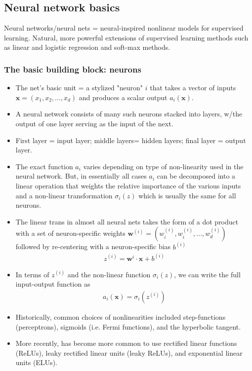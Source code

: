 \documentclass[norsk,a4paper,11pt]{article}
\begin{document}
\subsection{Neural network basics}
Neural networks/neural nets = neural-inspired nonlinear models for supervised learning. Natural, more powerful extensions of supervised learning methods such as linear and logistic regression and soft-max methods.

\subsubsection{The basic building block: neurons}
\begin{itemize}
	\item The net's basic unit = a stylized "neuron" $i$ that takes a vector of inputs $\bm{x} = (x_1, x_2, ..., x_d)$ and produces a scalar output $a_i(\bm{x})$.
	\item A neural network consists of many such neurons stacked into layers, w/the output of one layer serving as the input of the next.
	\item First layer = input layer; middle layers= hidden layers; final layer = output layer.
	\item The exact function $a_i$ varies depending on type of non-linearity used in the neural network. But, in essentially all cases $a_i$ can be decomposed into a linear operation that weights the relative importance of the various inputs and a non-linear transformation $\sigma_i(z)$ which is usually the same for all neurons.
	\item The linear trans in almost all neural nets takes the form of a dot product with a set of neuron-specific weights $\bm{w}^{(i)} = (w_i^{(i)}, w_i^{(i)}, ..., w_d^{(i)})$ followed by re-centering with a neuron-specific bias $b^{(i)}$
	\begin{align}
		z^{(i)} = \bm{w}^{i} \cdot \bm{x} + b^{(i)}
	\end{align}
	\item In terms of $z^{(i)}$ and the non-linear function $\sigma_i(z)$, we can write the full input-output function as
	\begin{align}
		a_i(\bm{x}) = \sigma_i(z^{(i)})
	\end{align}
	\item Historically, common choices of nonlinearities included step-functions (perceptrons), sigmoids (i.e. Fermi functions), and the hyperbolic tangent.
	\item More recently, has become more common to use rectified linear functions (ReLUs), leaky rectified linear units (leaky ReLUs), and exponential linear units (ELUs).

\end{itemize}
\end{document}
